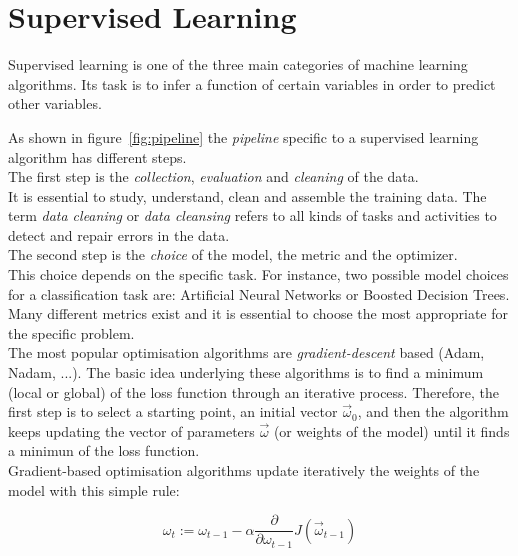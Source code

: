 \section{Supervised Learning}

Supervised learning is one of the three main categories of machine learning algorithms.
Its task is to infer a function of certain variables in order to predict other variables.

As shown in figure~\ref{fig:pipeline} the \textit{pipeline} specific to a supervised learning algorithm has different steps.\\

The first step is the \textit{collection}, \textit{evaluation} and \textit{cleaning} of the data.\\
It is essential to study, understand, clean and assemble the training data.
The term \textit{data cleaning} or \textit{data cleansing} refers to all kinds of tasks and activities to detect and repair errors in the data.\\

The second step is the \textit{choice} of the model, the metric and the optimizer.\\
This choice depends on the specific task.
For instance, two possible model choices for a classification task are: Artificial Neural Networks or Boosted Decision Trees.\\
Many different metrics exist and it is essential to choose the most appropriate for the specific problem.\\
The most popular optimisation algorithms are \textit{gradient-descent} based (Adam, Nadam, ...).
The basic idea underlying these algorithms is to find a minimum (local or global) of the loss function through an iterative process.
Therefore, the first step is to select a starting point, an initial vector $\vec{\omega}_0$, and then the algorithm keeps updating the vector of 
parameters $\vec{\omega}$ (or weights of the model) until it finds a minimun of the loss function.\\
Gradient-based optimisation algorithms update iteratively the weights of the model with this simple rule:

\begin{equation}
\omega_{t} := \omega_{t-1} - \alpha \frac{\partial}{\partial \omega_{t-1}} J(\vec{\omega}_{t-1})
\label{eq:update-param}
\end{equation}

